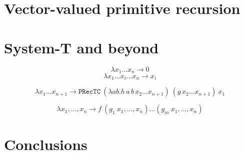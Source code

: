 \documentclass{jfp}
\newcommand{\xn}{x_1,\dots,x_n }
\begin{document}
\section{Vector-valued primitive recursion}
\label{sec:vect-valu-prim}

\section{System-T and beyond}
\label{sec:system-t-beyond}

$$\lambda x_1 \dots x_{n} \rightarrow 0 $$
$$\lambda x_1 \dots x_i \dots x_{n} \rightarrow x_i $$

$$\lambda x_1 \dots x_{n+1} \rightarrow \mathtt{PRecTC} \ (\lambda a b . h \, a \, b \, x_2 \dots x_{n+1}) \ (g \, x_2 \dots x_{n+1}) \ x_1 $$

$$\lambda \xn \rightarrow  f \ (g_1 \ \xn) \dots (g_m \ \xn) $$


\section{Conclusions}
\label{sec:conclusions}




\label{lastpage01}
\end{document}
